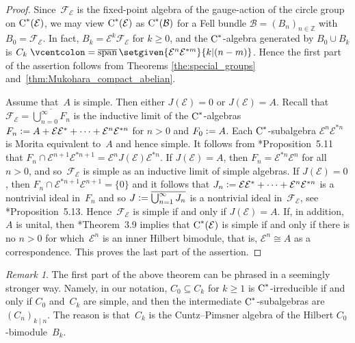 \documentclass[a4paper]{amsart}
\theoremstyle{plain}
\theoremstyle{definition}
\theoremstyle{remark}
\newtheorem{remark}[theorem]{Remark}
\numberwithin{theorem}{section}
\numberwithin{equation}{section}
\DeclareMathOperator*{\clsp}{\overline{span}} %
\newcommand*{\nb}{\nobreakdash}
\newcommand*{\Z}{\mathbb Z}
\newcommand*{\Cst}{\textup C^*}%
\newcommand*{\Hilm}[1][E]{\mathcal #1}%
\newcommand*{\B}{\mathcal B}%
\newcommand*{\defeq}{\mathrel{\vcentcolon=}}%
\begin{document}
\begin{proof}
  Since~\(\Hilm[F]_{\Hilm}\) is the fixed-point algebra of the
  gauge-action of the circle group on \(\Cst(\Hilm)\), we may view
  \(\Cst(\Hilm)\)
  as \(\Cst(\B)\) for a Fell bundle \(\B=(B_n)_{n\in \Z}\) with
  \(B_0=\Hilm[F]_{\Hilm}\).
  In fact, \(B_k=\Hilm^k \Hilm[F]_{\Hilm}\) for \(k\ge 0\), and the
  \(\Cst\)\nb-algebra generated by \(B_0\cup B_k\)
  is \(C_k\defeq\clsp\setgiven{\Hilm^n\Hilm^{*m}}{k|(n-m)}\).
  Hence the first part of the assertion follows from Theorems
  \ref{the:special_groups} and~\ref{thm:Mukohara_compact_abelian}.

  Assume that~\(A\) is simple.
  Then either \(J(\Hilm)=0\) or \(J(\Hilm)=A\).
  Recall that
  \(\Hilm[F]_{\Hilm}=\overline{\bigcup_{n=0}^\infty F_n}\) is the
  inductive limit of the \(\Cst\)\nb-algebras \(F_n\defeq A + \Hilm
  \Hilm^* +\dotsb + \Hilm^n\Hilm^{*n}\) for \(n>0\) and \(F_0\defeq
  A\).
  Each \(\Cst\)\nb-subalgebra \(\Hilm^n\Hilm^{*n}\) is Morita
  equivalent to~\(A\) and hence simple.
  It follows from
  \cite{Katsura:Cstar_correspondences}*{Proposition~5.11} that \(F_n
  \cap \Hilm^{n+1}\Hilm^{*n+1}=\Hilm^nJ(\Hilm)\Hilm^{*n}\).
  If \(J(\Hilm)=A\), then \(F_n=\Hilm^{*n}\Hilm^n\) for all \(n>0\),
  and so~\(\Hilm[F]_{\Hilm}\) is simple as an inductive limit of
  simple algebras.
  If \(J(\Hilm)=0\), then \(F_n\cap \Hilm^{*n+1} \Hilm^{n+1} = \{0\}\)
  and it follows that \(J_n\defeq \Hilm \Hilm^* + \dotsb + \Hilm^n\Hilm^{*n}\)
  is a nontrivial ideal in~\(F_n\) and so \(J\defeq
  \overline{\bigcup_{n=1}^\infty J_n}\) is a nontrivial ideal
  in~\(\Hilm[F]_{\Hilm}\), see
  \cite{Katsura:Cstar_correspondences}*{Proposition~5.13}.
  Hence~\(\Hilm[F]_{\Hilm}\) is simple if and only if \(J(\Hilm)=A\).
  If, in addition, \(A\) is unital, then
  \cite{Schweizer:Dilations_correspondences}*{Theorem~3.9} implies
  that \(\Cst(\Hilm)\) is simple if and only if there is no \(n>0\)
  for which~\(\Hilm^n\) is an inner Hilbert bimodule, that is,
  \(\Hilm^n\cong A\) as a correspondence.
  This proves the last part of the assertion.
\end{proof}

\begin{remark}
  The first part of the above theorem can be phrased in a seemingly
  stronger way.
  Namely, in our notation, \(C_0\subseteq C_k\) for \(k\ge 1\)
  is \(\Cst\)\nb-irreducible if and only if \(C_0\) and~\(C_k\)
  are simple, and then the intermediate \(\Cst\)\nb-subalgebras are
  \((C_n)_{k\mid n}\).
  The reason is that~\(C_k\) is the Cuntz--Pimsner algebra of the
  Hilbert \(C_0\)\nb-bimodule~\(B_k\).
\end{remark}
\end{document}
